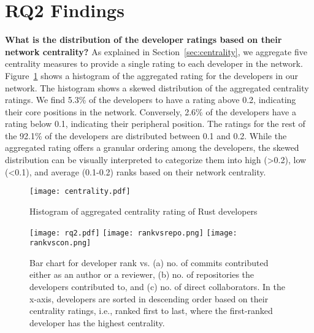 \documentclass[10pt,journal,compsoc]{IEEEtran}
\begin{document}
\section{RQ2 Findings}
\label{sec:rq2}
\textbf{What is the distribution of the developer ratings based on their network centrality?}
As explained in Section~\ref{sec:centrality}, we aggregate five centrality measures to provide a single rating to each developer in the network. Figure~\ref{fig:centralized} shows a histogram of the aggregated rating for the developers in our network. The histogram shows a skewed distribution of the aggregated centrality ratings. We find 5.3\% of the developers to have a rating above 0.2, indicating their core positions in the network. Conversely, 2.6\% of the developers have a rating below 0.1, indicating their peripheral position. The ratings for the rest of the 92.1\% of the developers are distributed between 0.1 and 0.2. While the aggregated rating offers a granular ordering among the developers, the skewed distribution can be visually interpreted to categorize them into high (>0.2), low (<0.1), and average (0.1-0.2) ranks based on their network centrality.
 
 \begin{figure}
    \centering    \texttt{[image: centrality.pdf]}
    \caption{Histogram of aggregated centrality rating of Rust developers}
    \label{fig:centralized}
\end{figure}
\begin{figure*}
    \centering
    \subfloat[\label{fig:commit}]{} 
    {{\texttt{[image: rq2.pdf]} }}
    \subfloat[\label{fig:repos}]{}
    {{\texttt{[image: rankvsrepo.png]} }
    \subfloat[\label{fig:collab}]{}
    {{\texttt{[image: rankvscon.png]} }}
    }
    \caption{Bar chart for developer rank vs. (a) no. of commits contributed either as an author or a reviewer, (b) no. of repositories the developers contributed to, and (c) no. of direct collaborators. In the x-axis, developers are sorted in descending order based on their centrality ratings, i.e., ranked first to last, where the first-ranked developer has the highest centrality.}
    \label{fig:rq2}
\end{figure*}
\end{document}
